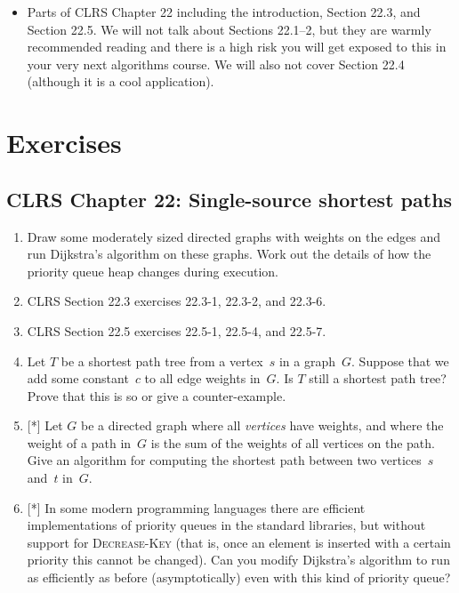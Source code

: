 \documentclass[12pt,a4paper]{article}
\theoremstyle{plain}
\theoremstyle{definition}
\begin{document}
\begin{itemize}

\item
  Parts of CLRS Chapter 22 including the introduction, Section 22.3,
  and Section 22.5. We will not talk about Sections 22.1--2, but they
  are warmly recommended reading and there is a high risk you will get
  exposed to this in your very next algorithms course. We will also
  not cover Section 22.4 (although it is a cool application).

\end{itemize}

\section*{Exercises}

\subsection*{CLRS Chapter 22:  Single-source shortest paths}

\begin{enumerate}
\item
  Draw some moderately sized directed graphs
  with weights on the edges and run 
  Dijkstra's algorithm on these graphs.
  Work out the details of how the priority queue heap changes during
  execution.

\item
  CLRS Section 22.3 exercises
  22.3-1,
  22.3-2,
  and
  22.3-6.

\item
  CLRS Section 22.5 exercises
  22.5-1,
  22.5-4,
  and
  22.5-7.

\item
  Let $T$ be a shortest path tree from a vertex~$s$ in a graph~$G$.
  Suppose that we add some constant~$c$ to all edge weights in~$G$. 
  Is $T$ still a shortest path tree? Prove that this is so or give a
  counter-example. 

\item{}[*]
  Let $G$ be a directed graph where all \emph{vertices} have weights,
  and where the weight of a path in~$G$ is the sum of the weights of
  all vertices on the path. Give an algorithm for computing the
  shortest path between two vertices~$s$ and~$t$ in~$G$.

\item{}[*]
  In some modern programming languages there are efficient
  implementations of priority queues in the standard libraries, but
  without support for 
  \textsc{Decrease-Key} (that is, once an element is inserted with a
  certain priority this cannot be changed).
  Can you modify Dijkstra's algorithm to run as efficiently as before
  (asymptotically)
  even with this kind of priority queue?



  
\end{enumerate}
\end{document}
